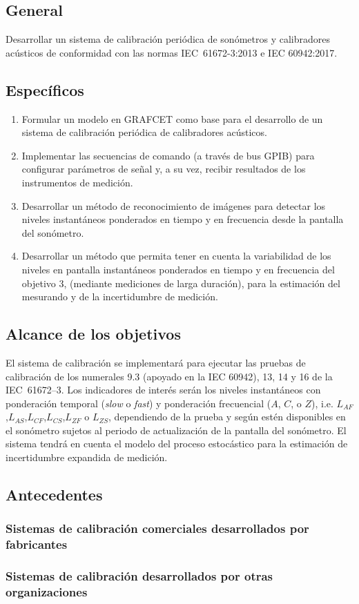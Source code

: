 \subsection{General}
Desarrollar un sistema de calibración periódica de sonómetros y calibradores acústicos de conformidad con las normas \mbox{IEC 61672-3:2013} e {IEC 60942:2017}.

\subsection{Específicos}

\begin{enumerate}
\item Formular un modelo en GRAFCET como base para el desarrollo de un sistema de calibración periódica de calibradores acústicos.
\item Implementar las secuencias de comando (a través de bus GPIB) para configurar parámetros de señal y, a su vez, recibir resultados de los instrumentos de medición.
\item Desarrollar un método de reconocimiento de imágenes para detectar los niveles instantáneos ponderados en tiempo y en frecuencia desde la pantalla del sonómetro.
\item Desarrollar un método que permita tener en cuenta la variabilidad de los niveles en pantalla instantáneos ponderados en tiempo y en frecuencia del objetivo 3, (mediante mediciones de larga duración), para la estimación del mesurando y de la incertidumbre de medición.
\end{enumerate}

\subsection{Alcance de los objetivos}
El sistema de calibración se implementará para ejecutar las pruebas de calibración de los numerales 9.3 (apoyado en la IEC 60942), 13, 14 y 16 de la \mbox{IEC 61672--3}.
Los indicadores de interés serán los niveles instantáneos con ponderación temporal (\emph{slow} o \emph{fast}) y ponderación frecuencial ($A$, $C$, o $Z$), i.e. $L_{AF}$,$L_{AS}$,$L_{CF}$,$L_{CS}$,$L_{ZF}$ o $L_{ZS}$, dependiendo de la prueba y según estén disponibles en el sonómetro sujetos al periodo de actualización de la pantalla del sonómetro.
El sistema tendrá en cuenta el modelo del proceso estocástico para la estimación de incertidumbre expandida de medición.

\subsection{Antecedentes}
\subsubsection{Sistemas de calibración comerciales desarrollados por fabricantes}
\subsubsection{Sistemas de calibración desarrollados por otras organizaciones}

\vfill